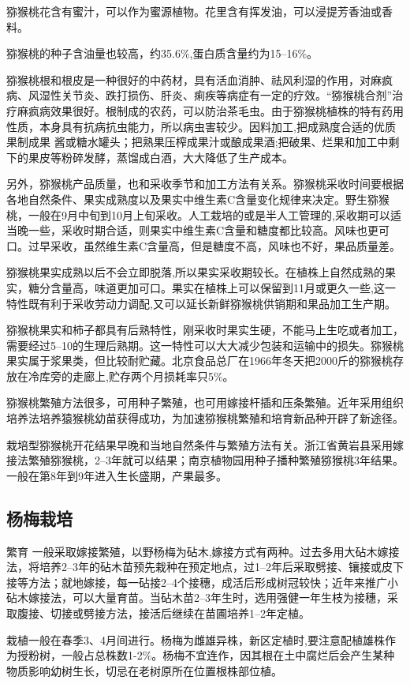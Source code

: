 \documentclass{ctexbook}
\begin{document}
猕猴桃花含有蜜汁，可以作为蜜源植物。花里含有挥发油，可以浸提芳香油或香料。

猕猴桃的种子含油量也较高，约35.6\%,蛋白质含量约为15--16\%。

猕猴桃根和根皮是一种很好的中药材，具有活血消肿、祛风利湿的作用，对麻疯病、风湿性关节炎、跌打损伤、肝炎、痢疾等病症有一定的疗效。“猕猴桃合剂”治疗麻疯病效果很好。根制成的农药，可以防治茶毛虫。由于猕猴桃植株的特有药用性质，本身具有抗病抗虫能力，所以病虫害较少。因料加工,把成熟度合适的优质果制成果
酱或糖水罐头；把熟果压榨成果汁或酿成果酒;把破果、烂果和加工中剩下的果皮等粉碎发酵，蒸馏成白酒，大大降低了生产成本。

另外，猕猴桃产品质量，也和采收季节和加工方法有关系。猕猴桃采收时间要根据各地自然条件、果实成熟度以及果实中维生素C含量变化规律来决定。野生猕猴桃，一般在9月中旬到10月上旬采收。人工栽培的或是半人工管理的,采收期可以适当晚一些，采收时期合适，则果实中维生素C含量和糖度都比较高。风味也更可口。过早采收，虽然维生素C含量高，但是糖度不高，风味也不好，果品质量差。

猕猴桃果实成熟以后不会立即脱落,所以果实采收期较长。在植株上自然成熟的果实，糖分含量高，味道更加可口。果实在植株上可以保留到11月或更久一些,这一特性既有利于采收劳动力调配,又可以延长新鲜猕猴桃供销期和果品加工生产期。

猕猴桃果实和柿子都具有后熟特性，刚采收时果实生硬，不能马上生吃或者加工，需要经过5--10的生理后熟期。这一特性可以大大减少包装和运输中的损失。猕猴桃果实属于浆果类，但比较耐贮藏。北京食品总厂在1966年冬天把2000斤的猕猴桃存放在冷库旁的走廊上,贮存两个月损耗率只5\%。

猕猴桃繁殖方法很多，可用种子繁殖，也可用嫁接杆插和压条繁殖。近年采用组织培养法培养猿猴桃幼苗获得成功，为加速猕猴桃繁殖和培育新品种开辟了新途径。

栽培型猕猴桃开花结果早晚和当地自然条件与繁殖方法有关。浙江省黄岩县采用嫁接法繁殖猕猴桃，2--3年就可以结果；南京植物园用种子播种繁殖猕猴桃3年结果。一般在第8年到9年进入生长盛期，产果最多。
\subsection{杨梅栽培}
繁育 一般采取嫁接繁殖，以野杨梅为砧木,嫁接方式有两种。过去多用大砧木嫁接法，将培养2--3年的砧木苗预先栽种在预定地点，过1--2年后采取劈接、镶接或皮下接等方法；就地嫁接，每一砧接2--4个接穗，成活后形成树冠较快；近年来推广小砧木嫁接法，可以大量育苗。当砧木苗2--3年生时，选用强健一年生枝为接穗，采取腹接、切接或劈接方法，接活后继续在苗圃培养1--2年定植。

栽植一般在春季3、4月间进行。杨梅为雌雄异株，新区定植时,要注意配植雄株作为授粉树，一般占总株数1-2\%。杨梅不宜连作，因其根在土中腐烂后会产生某种物质影响幼树生长，切忌在老树原所在位置根株部位植。
\end{document}
